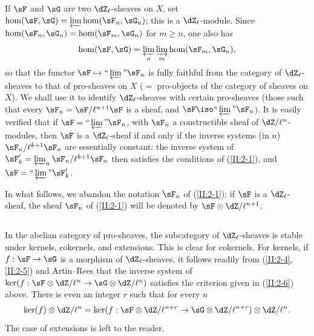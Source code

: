 If $\sF$ and $\sG$ are two $\dZ_\ell$-sheaves on $X$, set
$\hom(\sF,\sG) = \varprojlim \hom(\sF_n,\sG_n)$; this is a $\dZ_\ell$-module.
Since $\hom(\sF_n,\sG_n) = \hom(\sF_m,\sG_n)$ for $m\geqslant n$, one also
has
\[
  \hom(\sF,\sG) = \varprojlim_n \varinjlim_m \hom(\sF_m,\sG_n) \text{,}
\]
so that the functor $\sF\mapsto \text{``}\varprojlim\text{''}\sF_n$ is fully
faithful from the category of $\dZ_\ell$-sheaves to that of pro-sheaves on
$X$ ($=$ pro-objects of the category of sheaves on $X$). We shall use it to
identify $\dZ_\ell$-sheaves with certain pro-sheaves (those such that every
$\sF_n=\sF/\ell^{n+1}\sF$ is a sheaf, and
$\sF\iso \text{``}\varprojlim\text{''}\sF_n$). It is easily verified that if
$\sF=\text{``}\varprojlim\text{''}\sF_n$, with $\sF_n$ a constructible sheaf
of $\dZ/\ell^n$-modules, then $\sF$ is a $\dZ_\ell$-sheaf if and only if the
inverse systems (in $n$) $\sF_n/\ell^{k+1}\sF_n$ are essentially constant:
the inverse system of
$\sF_k'=\varprojlim_n\sF_n/\ell^{k+1}\sF_n$ then satisfies the conditions of
(\ref{II:2-1}), and
$\sF=\text{``}\varprojlim\text{''}\sF_k'$.

In what follows, we abandon the notation $\sF_n$ of (\ref{II:2-1}); if
$\sF$ is a $\dZ_\ell$-sheaf, the sheaf $\sF_n$ of (\ref{II:2-1}) will be
denoted by $\sF\otimes\dZ/\ell^{n+1}$.






\subsection{}\label{II:2-7}

In the abelian category of pro-sheaves, the subcategory of
$\dZ_\ell$-sheaves is stable under kernels, cokernels, and extensions. This is
clear for cokernels. For kernels, if $f:\sF\to\sG$ is a morphism of
$\dZ_\ell$-sheaves, it follows readily from
(\ref{II:2-4}, \ref{II:2-5}) and Artin--Rees that the inverse system of
$\ker(f:\sF\otimes\dZ/\ell^n\to\sG\otimes\dZ/\ell^n)$ satisfies the
criterion given in (\ref{II:2-6}) above. There is even an integer $r$ such
that for every $n$
\[
  \ker(f)\otimes\dZ/\ell^n = \ker(f:\sF\otimes\dZ/\ell^{n+r}\to\sG\otimes\dZ/\ell^{n+r})\otimes\dZ/\ell^n \text{.}
\]
The case of extensions is left to the reader.






\subsection{}\label{II:2-8}

